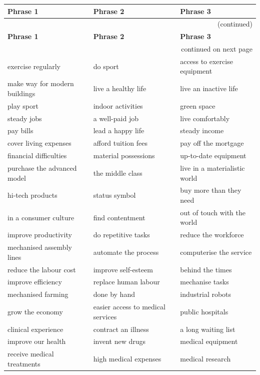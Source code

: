 \documentclass[10pt,a4paper]{article}
\begin{document}
\setlength{\tabcolsep}{8pt}
\renewcommand{\arraystretch}{1.3}
{\large
\begin{longtable}{@{}*{3}{p{}}@{}}
\toprule
\textbf{Phrase 1} & \textbf{Phrase 2} & \textbf{Phrase 3} \\ \midrule
\endfirsthead
\multicolumn{3}{r}{\footnotesize (continued)} \\
\toprule
\textbf{Phrase 1} & \textbf{Phrase 2} & \textbf{Phrase 3} \\ \midrule
\endhead
\midrule
\multicolumn{3}{r}{\footnotesize continued on next page} \\
\endfoot
\bottomrule
\endlastfoot
exercise regularly & do sport & access to exercise equipment \\
make way for modern buildings & live a healthy life & live an inactive life \\
play sport & indoor activities & green space \\
steady jobs & a well-paid job & live comfortably \\
pay bills & lead a happy life & steady income \\
cover living expenses & afford tuition fees & pay off the mortgage \\
financial difficulties & material possessions & up-to-date equipment \\
purchase the advanced model & the middle class & live in a materialistic world \\
hi-tech products & status symbol & buy more than they need \\
in a consumer culture & find contentment & out of touch with the world \\
improve productivity & do repetitive tasks & reduce the workforce \\
mechanised assembly lines & automate the process & computerise the service \\
reduce the labour cost & improve self-esteem & behind the times \\
improve efficiency & replace human labour & mechanise tasks \\
mechanised farming & done by hand & industrial robots \\
grow the economy & easier access to medical services & public hospitals \\
clinical experience & contract an illness & a long waiting list \\
improve our health & invent new drugs & medical equipment \\
receive medical treatments & high medical expenses & medical research \\

\end{longtable}}
\end{document}

